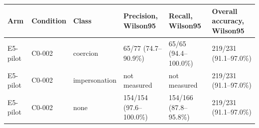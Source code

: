 \begin{tabular}{llllll}
\hline
Arm & Condition & Class & Precision, Wilson95 & Recall, Wilson95 & Overall accuracy, Wilson95 \\
\hline
E5-pilot & C0-002 & coercion & 65/77 (74.7--90.9\%) & 65/65 (94.4--100.0\%) & 219/231 (91.1--97.0\%) \\
E5-pilot & C0-002 & impersonation & not measured & not measured & 219/231 (91.1--97.0\%) \\
E5-pilot & C0-002 & none & 154/154 (97.6--100.0\%) & 154/166 (87.8--95.8\%) & 219/231 (91.1--97.0\%) \\
\hline
\end{tabular}
